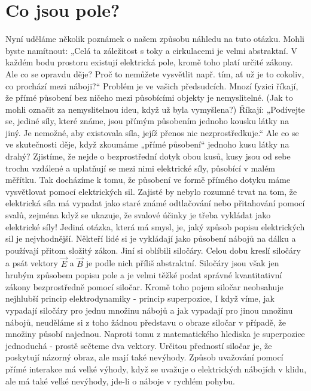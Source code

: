   \section{Co jsou pole?}  
    \cite[s.~23]{Feynman02} Nyní uděláme několik poznámek o našem způsobu náhledu na tuto otázku. 
    Mohli byste namítnout: „Celá ta záležitost s toky a cirkulacemi je velmi abstraktní. V každém 
    bodu prostoru existují elektrická pole, kromě toho platí určité zákony. Ale co se opravdu děje? 
    Proč to nemůžete vysvětlit např. tím, ať už je to cokoliv, co prochází mezi náboji?“ Problém je 
    ve vašich předsudcích. 
    Mnozí fyzici říkají, že přímé působení bez ničeho mezi působícími objekty je nemyslitelné. (Jak to 
    mohli označit za nemyslitelnou ideu, když už byla vymyšlena?) Říkají: „Podívejte se, jediné síly, které 
    známe, jsou přímým působením jednoho kousku látky na jiný. Je nemožné, aby existovala síla, jejíž 
    přenos nic nezprostředkuje.“ Ale co se ve skutečnosti děje, když zkoumáme „přímé působení“ jednoho kusu 
    látky na drahý? Zjistíme, že nejde o bezprostřední dotyk obou kusů, kusy jsou od sebe trochu vzdálené a 
    uplatňují se mezi nimi elektrické síly, působící v malém měřítku. Tak docházíme k tomu, že působení ve 
    formě přímého dotyku máme vysvětlovat pomocí elektrických sil. Zajisté by nebylo rozumné trvat na tom, 
    že elektrická síla má vypadat jako staré známé odtlačování nebo přitahování pomocí svalů, zejména když 
    se ukazuje, že svalové účinky je třeba vykládat jako elektrické síly! Jediná otázka, která má smysl, 
    je, jaký způsob popisu elektrických sil je nejvhodnější. Někteří lidé si je vykládají jako působení 
    nábojů na dálku a používají přitom složitý zákon. Jiní si oblíbili siločáry. Celou dobu kreslí siločáry 
    a psát vektory \(\vec{E}\) a \(\vec{B}\) je podle nich příliš abstraktní. Siločáry jsou však jen hrubým 
    způsobem popisu pole a je velmi těžké podat správné kvantitativní zákony bezprostředně pomocí siločar. 
    Kromě toho pojem siločar neobsahuje nejhlubší princip elektrodynamiky - princip superpozice, I když 
    víme, jak vypadají siločáry pro jednu množinu nábojů a jak vypadají pro jinou množinu nábojů, neuděláme 
    si z toho žádnou představu o obraze siločar v případě, že množiny působí najednou. Naproti tomu z 
    matematického hlediska je superpozice jednoduchá - prostě sečteme dva vektory. Určitou předností 
    siločar je, že poskytují názorný obraz, ale mají také nevýhody. Způsob uvažování pomocí přímé interakce 
    má velké výhody, když se uvažuje o elektrických nábojích v klidu, ale má také velké nevýhody, jde-li o 
    náboje v rychlém pohybu.
    
